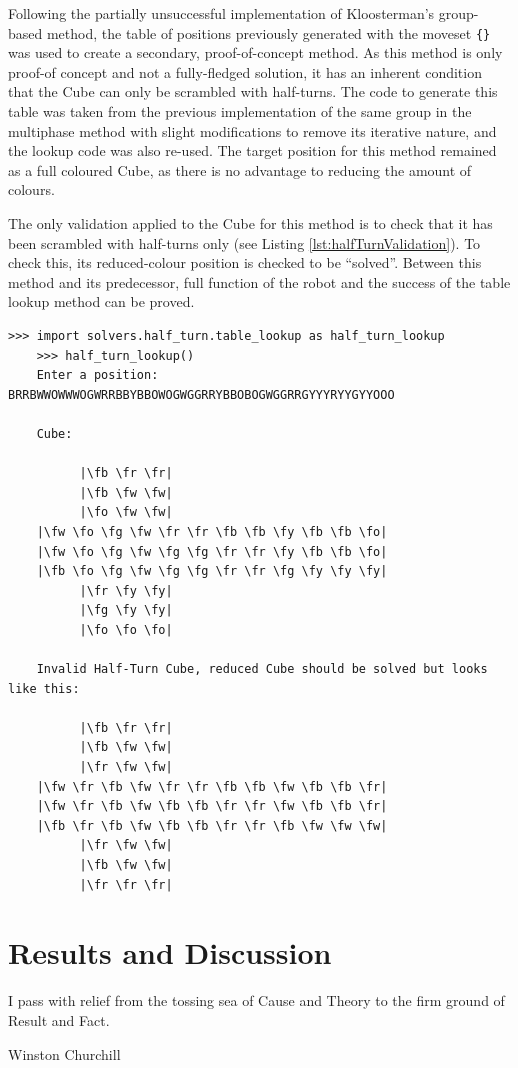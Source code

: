 \documentclass{report}
\newcommand{\moveset}[1]{\uppercase{\texttt{\{\formatmoves{#1}\}}}}
\newcommand{\fw}{\color{gray}W }
\newcommand{\fo}{\color{orange}O }
\newcommand{\fg}{\color{green}G }
\newcommand{\fr}{\color{red}R }
\newcommand{\fb}{\color{blue}B }
\newcommand{\fy}{\color{yellow}Y }
\begin{document}
	Following the partially unsuccessful implementation of Kloosterman's group-based method, the table of positions previously generated with the moveset \moveset{u2d2l2r2f2b"} was used to create a secondary, proof-of-concept method. As this method is only proof-of concept and not a fully-fledged solution, it has an inherent condition that the Cube can only be scrambled with half-turns. The code to generate this table was taken from the previous implementation of the same group in the multiphase method with slight modifications to remove its iterative nature, and the lookup code was also re-used. The target position for this method remained as a full coloured Cube, as there is no advantage to reducing the amount of colours.
	
	The only validation applied to the Cube for this method is to check that it has been scrambled with half-turns only (see Listing \ref{lst:halfTurnValidation}). To check this, its reduced-colour position is checked to be \enquote{solved}. Between this method and its predecessor, full function of the robot and the success of the table lookup method can be proved.	
	
	\begin{lstlisting}[caption={Half-Turn method validation}, label={lst:halfTurnValidation}]
	>>> import solvers.half_turn.table_lookup as half_turn_lookup
	>>> half_turn_lookup()
	Enter a position: BRRBWWOWWWOGWRRBBYBBOWOGWGGRRYBBOBOGWGGRRGYYYRYYGYYOOO
	
	Cube:
	
	      |\fb \fr \fr|
	      |\fb \fw \fw|
	      |\fo \fw \fw|
	|\fw \fo \fg \fw \fr \fr \fb \fb \fy \fb \fb \fo|
	|\fw \fo \fg \fw \fg \fg \fr \fr \fy \fb \fb \fo|
	|\fb \fo \fg \fw \fg \fg \fr \fr \fg \fy \fy \fy|
	      |\fr \fy \fy|
	      |\fg \fy \fy|
	      |\fo \fo \fo|
	      
	Invalid Half-Turn Cube, reduced Cube should be solved but looks like this:
	
	      |\fb \fr \fr|
	      |\fb \fw \fw|
	      |\fr \fw \fw|
	|\fw \fr \fb \fw \fr \fr \fb \fb \fw \fb \fb \fr|
	|\fw \fr \fb \fw \fb \fb \fr \fr \fw \fb \fb \fr|
	|\fb \fr \fb \fw \fb \fb \fr \fr \fb \fw \fw \fw|
	      |\fr \fw \fw|
	      |\fb \fw \fw|
	      |\fr \fr \fr|\end{lstlisting}
	
    \newpage
    \chapter{Results and Discussion} \label{chp:resultsDiscussion}
   	\epigraph{I pass with relief from the tossing sea of Cause and Theory to the firm ground of Result and Fact.}{Winston Churchill \cite{Churchill1898}}
    
\end{document}
